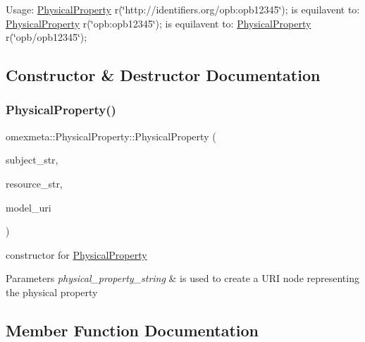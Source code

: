 Usage\+: \hyperlink{classomexmeta_1_1PhysicalProperty}{Physical\+Property} r(\char`\"{}http\+://identifiers.\+org/opb\+:opb12345\char`\"{}); is equilavent to\+: \hyperlink{classomexmeta_1_1PhysicalProperty}{Physical\+Property} r(\char`\"{}opb\+:opb12345\char`\"{}); is equilavent to\+: \hyperlink{classomexmeta_1_1PhysicalProperty}{Physical\+Property} r(\char`\"{}opb/opb12345\char`\"{}); 

\subsection{Constructor \& Destructor Documentation}
\mbox{\label{classomexmeta_1_1PhysicalProperty_a76d1ffd15ea6aad76c322bdd8991a111}} 
\subsubsection{\texorpdfstring{Physical\+Property()}{PhysicalProperty()}}
{\footnotesize\ttfamily omexmeta\+::\+Physical\+Property\+::\+Physical\+Property (\begin{DoxyParamCaption}\item[{std\+::string}]{subject\+\_\+str,  }\item[{std\+::string}]{resource\+\_\+str,  }\item[{std\+::string}]{model\+\_\+uri }\end{DoxyParamCaption})\hspace{0.3cm}{\ttfamily [explicit]}}



constructor for \hyperlink{classomexmeta_1_1PhysicalProperty}{Physical\+Property} 


\begin{DoxyParams}{Parameters}
{\em physical\+\_\+property\+\_\+string} & is used to create a U\+RI node representing the physical property \\
\hline
\end{DoxyParams}


\subsection{Member Function Documentation}
\mbox{\label{classomexmeta_1_1PhysicalProperty_a03056210a70ea8446b44de250646eeb5}} 

